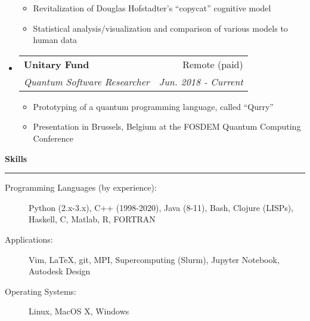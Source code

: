 \documentclass[letterpaper,11pt]{article}
\makeatletter
\newcommand{\sectionline}{
    \noindent\rule[0.5ex]{\linewidth}{0.5pt}
}
\newcommand{\resitem}[1]{\item #1 \vspace{-3pt}}
\newcommand{\resheading}[1]{
    {\large \textbf{#1}}
    \sectionline
}
\newcommand{\colfill}{@{\extracolsep{\fill}}}
\newcommand{\ressubheading}[4]{
\begin{tabular*}{6.5in}{l\colfill r}
		\textbf{#1} & #2 \\
		\textit{#3} & \textit{#4} \\
\end{tabular*}\vspace{-6pt}}
\makeatother
\begin{document}
\begin{itemize}
 	\begin{itemize}
 		\resitem{Revitalization of Douglas Hofstadter's ``copycat'' cognitive model}
 		\resitem{Statistical analysis/visualization and comparison of various models to human data}
 	\end{itemize}
 \item
     \ressubheading{Unitary Fund}{Remote (paid)}{Quantum Software Researcher}{Jun. 2018 - Current}
 	\begin{itemize}
            \resitem{Prototyping of a quantum programming language, called ``Qurry''}
            \resitem{Presentation in Brussels, Belgium at the FOSDEM Quantum Computing Conference}
 	\end{itemize}
\end{itemize}

\resheading{Skills}
\begin{description}
    \item[Programming Languages (by experience):] 
        Python (2.x-3.x), C++ (1998-2020), Java (8-11), Bash, Clojure (LISPs), Haskell, C, Matlab, R, FORTRAN
    \item[Applications:]
        Vim, \LaTeX, git, MPI, Supercomputing (Slurm), Jupyter Notebook, Autodesk Design 
    \item[Operating Systems:]
        Linux, MacOS X, Windows

\end{description}
\end{document}

